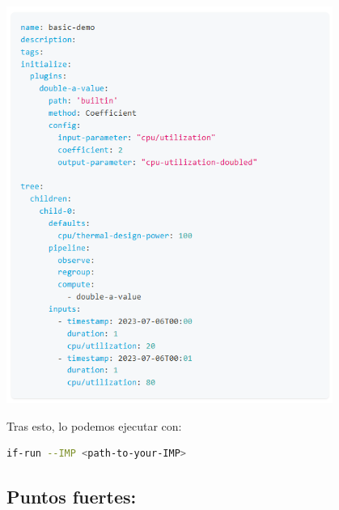 \documentclass[12pt,a4paper]{report}
\begin{document}
\begin{center}
  \includegraphics[width=0.8\textwidth]{imagenes/IF_1.png}
\end{center}

Tras esto, lo podemos ejecutar con:

\begin{tcolorbox}[colback=codebackground, colframe=codeborder, boxrule=0.8pt, arc=0mm, boxsep=5pt, left=5pt, right=5pt, top=5pt, bottom=5pt]
  \begin{lstlisting}[language=bash]
  if-run --IMP <path-to-your-IMP>
  \end{lstlisting}
\end{tcolorbox}

\subsection*{Puntos fuertes:}
\end{document}
